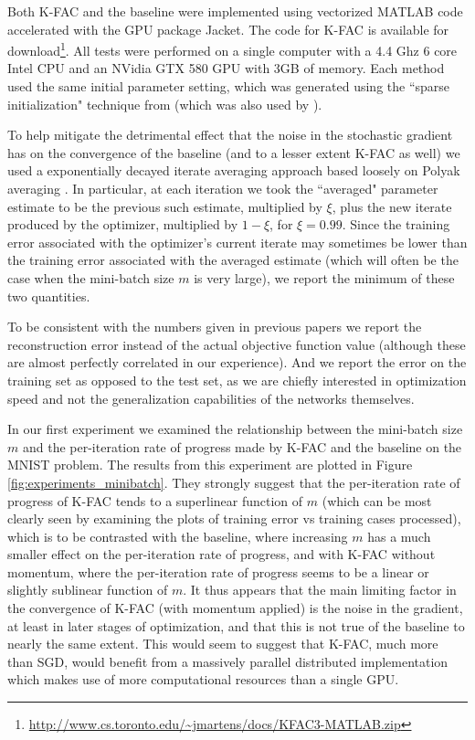 \documentclass[12pt]{article}
\newcommand{\acronym}{K-FAC}
\begin{document}
Both \acronym{} and the baseline were implemented using vectorized MATLAB code accelerated with the GPU package Jacket.  The code for \acronym{} is available for download\footnote{\url{http://www.cs.toronto.edu/~jmartens/docs/KFAC3-MATLAB.zip}}.  All tests were performed on a single computer with a 4.4 Ghz 6 core Intel CPU and an NVidia GTX 580 GPU with 3GB of memory.  Each method used the same initial parameter setting, which was generated using the ``sparse initialization" technique from \citet{HF} (which was also used by \citet{momentum_ilya}).  


To help mitigate the detrimental effect that the noise in the stochastic gradient has on the convergence of the baseline (and to a lesser extent \acronym{} as well) we used a exponentially decayed iterate averaging approach based loosely on Polyak averaging \citep[e.g.][]{kevin}.  In particular, at each iteration we took the ``averaged" parameter estimate to be the previous such estimate, multiplied by $\xi$, plus the new iterate produced by the optimizer, multiplied by $1-\xi$, for $\xi = 0.99$.  Since the training error associated with the optimizer's current iterate may sometimes be lower than the training error associated with the averaged estimate (which will often be the case when the mini-batch size $m$ is very large), we report the minimum of these two quantities.

To be consistent with the numbers given in previous papers we report the reconstruction error instead of the actual objective function value (although these are almost perfectly correlated in our experience).  And we report the error on the training set as opposed to the test set, as we are chiefly interested in optimization speed and not the generalization capabilities of the networks themselves.

In our first experiment we examined the relationship between the mini-batch size $m$ and the per-iteration rate of progress made by \acronym{} and the baseline on the MNIST problem.  The results from this experiment are plotted in Figure \ref{fig:experiments_minibatch}.  They strongly suggest that the per-iteration rate of progress of \acronym{} tends to a superlinear function of $m$ (which can be most clearly seen by examining the plots of training error vs training cases processed), which is to be contrasted with the baseline, where increasing $m$ has a much smaller effect on the per-iteration rate of progress, and with \acronym{} without momentum, where the per-iteration rate of progress seems to be a linear or slightly sublinear function of $m$.  It thus appears that the main limiting factor in the convergence of \acronym{} (with momentum applied) is the noise in the gradient, at least in later stages of optimization, and that this is not true of the baseline to nearly the same extent.  This would seem to suggest that \acronym{}, much more than SGD, would benefit from a massively parallel distributed implementation which makes use of more computational resources than a single GPU.
\end{document}

